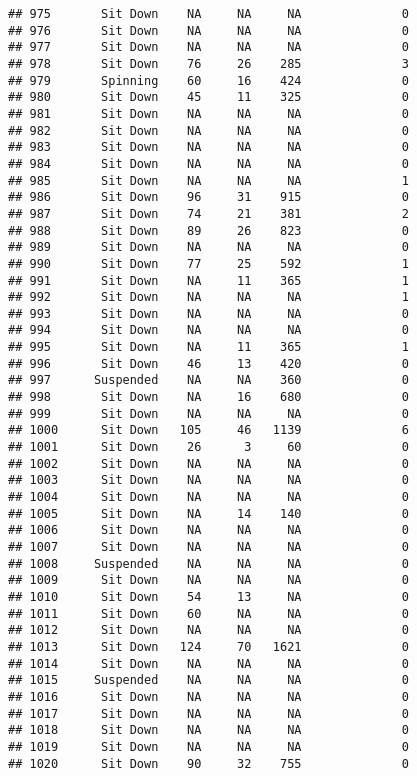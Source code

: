 \documentclass[
]{article}
\begin{document}
\begin{verbatim}
## 975       Sit Down    NA     NA     NA              0
## 976       Sit Down    NA     NA     NA              0
## 977       Sit Down    NA     NA     NA              0
## 978       Sit Down    76     26    285              3
## 979       Spinning    60     16    424              0
## 980       Sit Down    45     11    325              0
## 981       Sit Down    NA     NA     NA              0
## 982       Sit Down    NA     NA     NA              0
## 983       Sit Down    NA     NA     NA              0
## 984       Sit Down    NA     NA     NA              0
## 985       Sit Down    NA     NA     NA              1
## 986       Sit Down    96     31    915              0
## 987       Sit Down    74     21    381              2
## 988       Sit Down    89     26    823              0
## 989       Sit Down    NA     NA     NA              0
## 990       Sit Down    77     25    592              1
## 991       Sit Down    NA     11    365              1
## 992       Sit Down    NA     NA     NA              1
## 993       Sit Down    NA     NA     NA              0
## 994       Sit Down    NA     NA     NA              0
## 995       Sit Down    NA     11    365              1
## 996       Sit Down    46     13    420              0
## 997      Suspended    NA     NA    360              0
## 998       Sit Down    NA     16    680              0
## 999       Sit Down    NA     NA     NA              0
## 1000      Sit Down   105     46   1139              6
## 1001      Sit Down    26      3     60              0
## 1002      Sit Down    NA     NA     NA              0
## 1003      Sit Down    NA     NA     NA              0
## 1004      Sit Down    NA     NA     NA              0
## 1005      Sit Down    NA     14    140              0
## 1006      Sit Down    NA     NA     NA              0
## 1007      Sit Down    NA     NA     NA              0
## 1008     Suspended    NA     NA     NA              0
## 1009      Sit Down    NA     NA     NA              0
## 1010      Sit Down    54     13     NA              0
## 1011      Sit Down    60     NA     NA              0
## 1012      Sit Down    NA     NA     NA              0
## 1013      Sit Down   124     70   1621              0
## 1014      Sit Down    NA     NA     NA              0
## 1015     Suspended    NA     NA     NA              0
## 1016      Sit Down    NA     NA     NA              0
## 1017      Sit Down    NA     NA     NA              0
## 1018      Sit Down    NA     NA     NA              0
## 1019      Sit Down    NA     NA     NA              0
## 1020      Sit Down    90     32    755              0

\end{verbatim}
\end{document}

